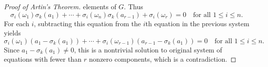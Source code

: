 \documentclass[12pt]{report}
\numberwithin{equation}{section}
\numberwithin{theorem}{chapter}
\theoremstyle{definition}
\newtheorem*{basic properties}{Basic Properties}
\newtheorem*{Important Remark}{Important Remark}
\begin{document}
\begin{proof}[Proof of Artin's Theorem]
elements of $G$. Thus
$$
\sigma_i(\omega_1) \sigma_k(a_1) + \cdots + \sigma_i(\omega_{n})\sigma_k(a_{r-1})
+ \sigma_i(\omega_{r})  = 0 \quad \textrm{for all } 1 \leqslant i \leqslant n.$$
For each $i$, subtracting this equation from the $i$th equation in the previous system yields
$$\sigma_i(\omega_1) (a_1 -  \sigma_k(a_1)) + \cdots + \sigma_i(\omega_{r-1})(a_{r-1} - \sigma_k(a_1) ) = 0 \quad \textrm{for all } 1 \leqslant i\leqslant n.$$
Since $a_1 - \sigma_k(a_1) \neq 0$, this is a nontrivial solution to original system of equations with fewer than $r$ nonzero components, which is a contradiction. 
\end{proof}






\printindex

%
%
\end{document}
